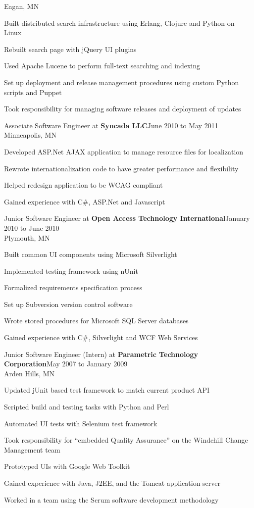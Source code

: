 \documentclass[letterpaper]{article}
\newenvironment{resume-list}
{\begin{itemize}
 \setlength{\itemsep}{0pt}
 \setlength{\parskip}{0pt}}
{\end{itemize}}
\begin{document}
Eagan, MN
\begin{resume-list}
\item Built distributed search infrastructure using Erlang, Clojure and Python on Linux
\item Rebuilt search page with jQuery UI plugins
\item Used Apache Lucene to perform full-text searching and indexing
\item Set up deployment and release management procedures using custom Python scripts and Puppet
\item Took responsibility for managing software releases and deployment of updates
\pagebreak
\end{resume-list}
\noindent Associate Software Engineer at {\bfseries Syncada LLC}\dotfill June 2010 to May 2011\\
Minneapolis, MN
\begin{resume-list}
\item Developed ASP.Net AJAX application to manage resource files for localization
\item Rewrote internationalization code to have greater performance and flexibility
\item Helped redesign application to be WCAG compliant
\item Gained experience with C\#, ASP.Net and Javascript
\end{resume-list}
\noindent Junior Software Engineer at {\bfseries Open Access Technology International}\dotfill January 2010 to June 2010\\
Plymouth, MN
\begin{resume-list}
\item Built common UI components using Microsoft Silverlight
\item Implemented testing framework using nUnit
\item Formalized requirements specification process
\item Set up Subversion version control software
\item Wrote stored procedures for Microsoft SQL Server databases
\item Gained experience with C\#, Silverlight and WCF Web Services
\end{resume-list}
\noindent Junior Software Engineer (Intern) at {\bfseries Parametric Technology Corporation}\dotfill May 2007 to January 2009\\
Arden Hills, MN
\begin{resume-list}
\item Updated jUnit based test framework to match current product API
\item Scripted build and testing tasks with Python and Perl
\item Automated UI tests with Selenium test framework
\item Took responsibility for ``embedded Quality Assurance'' on the Windchill Change Management team
\item Prototyped UIs with Google Web Toolkit
\item Gained experience with Java, J2EE, and the Tomcat application server
\item Worked in a team using the Scrum software development methodology
\end{resume-list}
\end{document}
